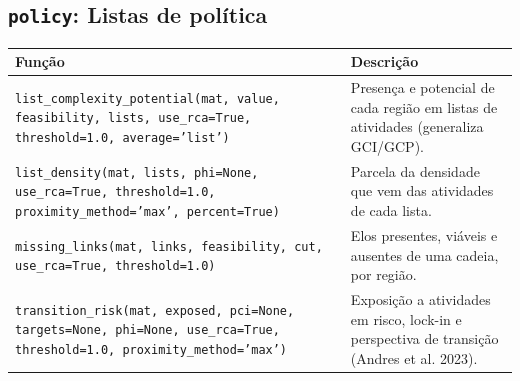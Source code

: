 \subsection{\texttt{policy}: Listas de pol\'{i}tica}
\begin{longtable}{>{\raggedright\arraybackslash}p{9.2cm} >{\raggedright\arraybackslash}p{7.0cm}}
\toprule
\textbf{Fun\c{c}\~{a}o} & \textbf{Descri\c{c}\~{a}o} \\
\midrule\endhead
\texttt{\footnotesize list\_complexity\_potential(mat, value, feasibility, lists, use\_rca=True, threshold=1.0, average='list')} & {\small Presen\c{c}a e potencial de cada regi\~{a}o em listas de atividades (generaliza GCI/GCP).} \\[2pt]
\texttt{\footnotesize list\_density(mat, lists, phi=None, use\_rca=True, threshold=1.0, proximity\_method='max', percent=True)} & {\small Parcela da densidade que vem das atividades de cada lista.} \\[2pt]
\texttt{\footnotesize missing\_links(mat, links, feasibility, cut, use\_rca=True, threshold=1.0)} & {\small Elos presentes, vi\'{a}veis e ausentes de uma cadeia, por regi\~{a}o.} \\[2pt]
\texttt{\footnotesize transition\_risk(mat, exposed, pci=None, targets=None, phi=None, use\_rca=True, threshold=1.0, proximity\_method='max')} & {\small Exposi\c{c}\~{a}o a atividades em risco, lock-in e perspectiva de transi\c{c}\~{a}o (Andres et al. 2023).} \\[2pt]
\bottomrule
\end{longtable}

